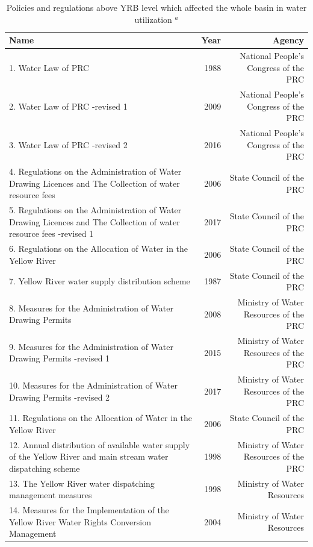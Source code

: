 \documentclass[9pt,twoside,lineno]{pnas-new}
\begin{document}

\begin{table}\centering
    \caption{Policies and regulations above YRB level which affected the whole basin in water utilization $^a$}
    
    \begin{tabular}{lrr}
    Name & Year & Agency \\
    \midrule
    1. Water Law of PRC & 1988 & National People's Congress of the PRC \\
    2. Water Law of PRC -revised 1 & 2009 & National People's Congress of the PRC \\
    3. Water Law of PRC -revised 2 & 2016 & National People's Congress of the PRC \\
    4. Regulations on the Administration of Water Drawing Licences and The Collection of water resource fees & 2006 & State Council of the PRC \\
    5. Regulations on the Administration of Water Drawing Licences and The Collection of water resource fees -revised 1 & 2017 & State Council of the PRC \\
    6. Regulations on the Allocation of Water in the Yellow River & 2006 & State Council of the PRC \\
    7. Yellow River water supply distribution scheme & 1987 & State Council of the PRC \\
    8. Measures for the Administration of Water Drawing Permits & 2008 & Ministry of Water Resources of the PRC \\
    9. Measures for the Administration of Water Drawing Permits -revised 1 & 2015 & Ministry of Water Resources of the PRC \\
    10. Measures for the Administration of Water Drawing Permits -revised 2 & 2017 & Ministry of Water Resources of the PRC \\
    11. Regulations on the Allocation of Water in the Yellow River & 2006 & State Council of the PRC \\
    12. Annual distribution of available water supply of the Yellow River and main stream water dispatching scheme & 1998 & Ministry of Water Resources of the PRC \\
    13. The Yellow River water dispatching management measures & 1998 & Ministry of Water Resources \\
    14. Measures for the Implementation of the Yellow River Water Rights Conversion Management & 2004 & Ministry of Water Resources \\

\end{tabular}
\end{table}
\end{document}
